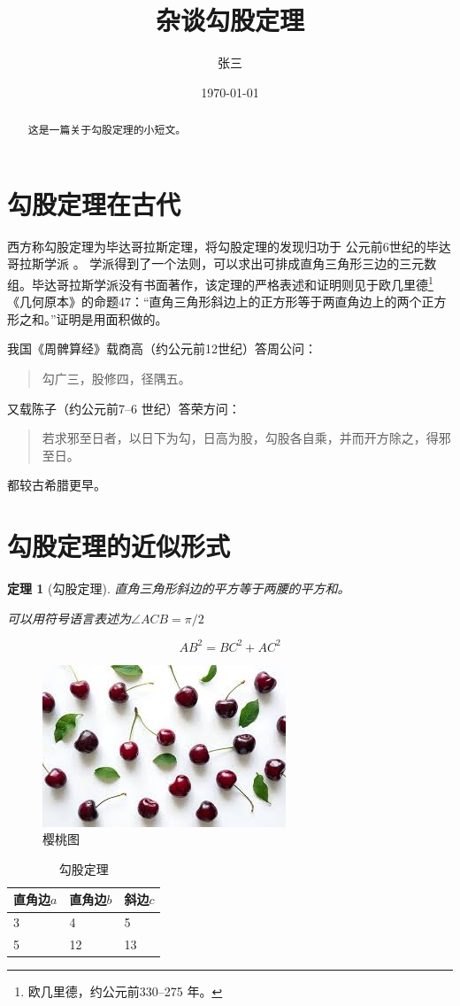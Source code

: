 \documentclass[UTF8]{ctexart}
\title{杂谈勾股定理}
\author{张三}
\date{\today}
\newtheorem{thm}{定理}
\begin{document}
\maketitle
\begin{abstract}
这是一篇关于勾股定理的小短文。
\end{abstract}

\tableofcontents

\section{勾股定理在古代}
西方称勾股定理为毕达哥拉斯定理，将勾股定理的发现归功于
公元前6世纪的毕达哥拉斯学派 \cite{quanjing} 。
学派得到了一个法则，可以求出可排成直角三角形三边的三元数组\cite{Shiye}。毕达哥拉斯学派没有书面著作，该定理的严格表述和证明则见于欧几里德\footnote{欧几里德，约公元前330--275 年。}《几何原本》的命题47：“直角三角形斜边上的正方形等于两直角边上的两个正方形之和。”证明是用面积做的。

我国《周髀算经》载商高（约公元前12世纪）答周公问：
\begin{quote}
\kaishu
勾广三，股修四，径隅五。
\end{quote}

又载陈子（约公元前7--6 世纪）答荣方问：
\begin{quote}
\kaishu
若求邪至日者，以日下为勾，日高为股，勾股各自乘，并而开方除之，得邪至日。
\end{quote}

都较古希腊更早。
\section{勾股定理的近似形式}
\begin{thm}[勾股定理]
直角三角形斜边的平方等于两腰的平方和。

可以用符号语言表述为$\angle ACB = \pi / 2$
\end{thm}
\begin{equation}
AB^2 = BC^2 + AC^2
\end{equation}

\begin{figure}[ht]
\centering
\includegraphics[scale=0.8]{images.jpg}
\caption{樱桃图}
\label{fig:cherry}
\end{figure}

\begin{table}[h]
\centering
\begin{tabular}{|lll|}
\hline
直角边$a$ & 直角边$b$ & 斜边$c$ \\
\hline
3 & 4 & 5 \\
5 & 12 & 13 \\
\hline
\end{tabular}
\caption{勾股定理}
\end{table}



\end{document}

